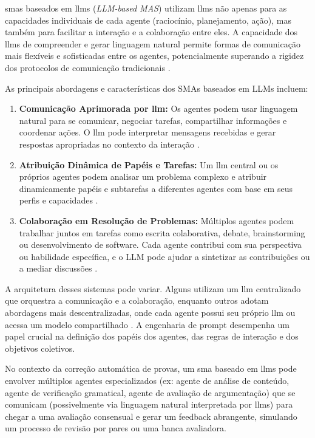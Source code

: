 \gls{sma}s baseados em \gls{llm}s (\textit{LLM-based MAS}) utilizam \gls{llm}s não apenas para as capacidades individuais de cada agente (raciocínio, planejamento, ação), mas também para facilitar a interação e a colaboração entre eles. A capacidade dos \gls{llm}s de compreender e gerar linguagem natural permite formas de comunicação mais flexíveis e sofisticadas entre os agentes, potencialmente superando a rigidez dos protocolos de comunicação tradicionais \cite{chen_survey_2025}.

As principais abordagens e características dos SMAs baseados em LLMs incluem:

\begin{enumerate}
    \item \textbf{Comunicação Aprimorada por \gls{llm}:} Os agentes podem usar linguagem natural para se comunicar, negociar tarefas, compartilhar informações e coordenar ações. O \gls{llm} pode interpretar mensagens recebidas e gerar respostas apropriadas no contexto da interação \cite{yan_beyond_2025}.

    \item \textbf{Atribuição Dinâmica de Papéis e Tarefas:}  Um \gls{llm} central ou os próprios agentes podem analisar um problema complexo e atribuir dinamicamente papéis e subtarefas a diferentes agentes com base em seus perfis e capacidades \cite{wang_survey_2025}.

    \item \textbf{Colaboração em Resolução de Problemas:} Múltiplos agentes podem trabalhar juntos em tarefas como escrita colaborativa, debate, brainstorming ou desenvolvimento de software. Cada agente contribui com sua perspectiva ou habilidade específica, e o LLM pode ajudar a sintetizar as contribuições ou a mediar discussões \cite{qian_chatdev_2024}.

\end{enumerate}

A arquitetura desses sistemas pode variar. Alguns utilizam um \gls{llm} centralizado que orquestra a comunicação e a colaboração, enquanto outros adotam abordagens mais descentralizadas, onde cada agente possui seu próprio \gls{llm} ou acessa um modelo compartilhado \cite{chen_survey_2025}. A engenharia de prompt desempenha um papel crucial na definição dos papéis dos agentes, das regras de interação e dos objetivos coletivos.

No contexto da correção automática de provas, um \gls{sma} baseado em \gls{llm}s pode envolver múltiplos agentes especializados (ex: agente de análise de conteúdo, agente de verificação gramatical, agente de avaliação de argumentação) que se comunicam (possivelmente via linguagem natural interpretada por \gls{llm}s) para chegar a uma avaliação consensual e gerar um feedback abrangente, simulando um processo de revisão por pares ou uma banca avaliadora.

